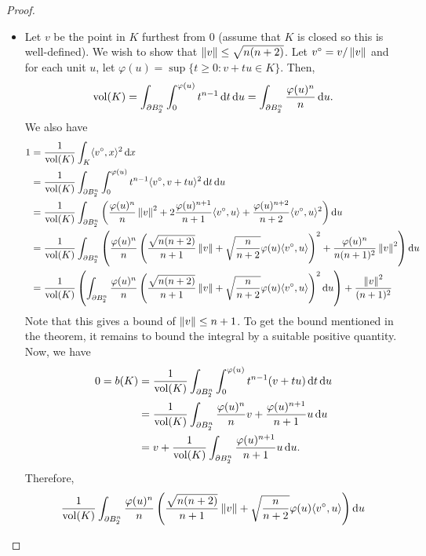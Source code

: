\begin{proof}
\begin{itemize}
				\item Let $v$ be the point in $K$ furthest from $0$ (assume that $K$ is closed so this is well-defined). We wish to show that $\left\lVert v\right\rVert\leq\sqrt{n(n+2)}$. Let $v^{\circ} = v/\left\lVert v\right\rVert$ and for each unit $u$, let $\varphi(u) = \sup\{t\geq 0 : v+tu\in K\}$. Then,
				\[ \operatorname{vol}(K) = \int_{\partial B_2^n} \int_{0}^{\varphi(u)} t^{n-1}\operatorname{d}\!{t}\operatorname{d}\!{u} = \int_{\partial B_2^n} \frac{\varphi(u)^n}{n} \operatorname{d}\!{u}. \]
				We also have
				\begin{align*}
					1 &= \frac{1}{\operatorname{vol}(K)} \int_K \langle v^\circ, x\rangle^2 \operatorname{d}\!{x} \\
					 &=  \frac{1}{\operatorname{vol}(K)} \int_{\partial B_2^n} \int_0^{\varphi(u)} t^{n-1} \langle v^\circ, v+tu\rangle^2 \operatorname{d}\!{t}\operatorname{d}\!{u} \\
					 &= \frac{1}{\operatorname{vol}(K)} \int_{\partial B_2^n} \left( \frac{\varphi(u)^n}{n}\left\lVert v\right\rVert^2 + 2\frac{\varphi(u)^{n+1}}{n+1} \langle v^\circ, u\rangle + \frac{\varphi(u)^{n+2}}{n+2} \langle v^\circ, u\rangle^2 \right) \operatorname{d}\!{u} \\
					 &= \frac{1}{\operatorname{vol}(K)} \int_{\partial B_2^n} \left( \frac{\varphi(u)^n}{n} \left(\frac{\sqrt{n(n+2)}}{n+1}\left\lVert v\right\rVert + \sqrt{\frac{n}{n+2}}\varphi(u) \langle v^\circ, u\rangle\right)^2 + \frac{\varphi(u)^n}{n(n+1)^2}\left\lVert v\right\rVert^2 \right) \operatorname{d}\!{u} \\
					 &= \frac{1}{\operatorname{vol}(K)} \left( \int_{\partial B_2^n} \frac{\varphi(u)^n}{n} \left(\frac{\sqrt{n(n+2)}}{n+1}\left\lVert v\right\rVert + \sqrt{\frac{n}{n+2}}\varphi(u)\langle v^\circ, u\rangle\right)^2 \operatorname{d}\!{u} \right) + \frac{\left\lVert v\right\rVert^2}{(n+1)^2}
				\end{align*}
				Note that this gives a bound of $\left\lVert v\right\rVert\leq n+1$. To get the bound mentioned in the theorem, it remains to bound the integral by a suitable positive quantity. Now, we have
				\begin{align*}
					0 = b(K) &= \frac{1}{\operatorname{vol}(K)} \int_{\partial B_2^n} \int_{0}^{\varphi(u)} t^{n-1} (v+tu) \operatorname{d}\!{t}\operatorname{d}\!{u} \\
					 &= \frac{1}{\operatorname{vol}(K)} \int_{\partial B_2^n} \frac{\varphi(u)^n}{n}v + \frac{\varphi(u)^{n+1}}{n+1}u \operatorname{d}\!{u} \\
					 &= v + \frac{1}{\operatorname{vol}(K)} \int_{\partial B_2^n} \frac{\varphi(u)^{n+1}}{n+1}u\operatorname{d}\!{u}.
				\end{align*}
				Therefore,
				\begin{multline*}
					\frac{1}{\vol(K)} \int_{\partial B_2^n} \frac{\varphi(u)^n}{n} \left(\frac{\sqrt{n(n+2)}}{n+1}\norm{v} + \sqrt{\frac{n}{n+2}}\varphi(u) \langle v^\circ,u\rangle\right) \d{u} \\

\end{multline*}
\end{itemize}
\end{proof}
